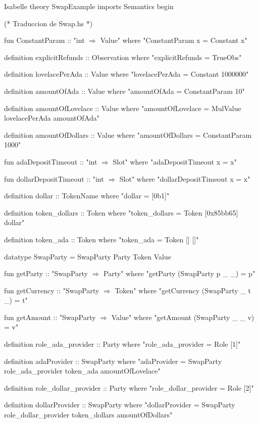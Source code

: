 \documentclass[12pt]{book}
\begin{document}
\begin{code}[title=Definición del contrato \textit{Swap}]{Isabelle}
theory SwapExample
  imports Semantics
begin

(* Traduccion de Swap.hs *)

fun ConstantParam :: "int $\Rightarrow$ Value" where
"ConstantParam x = Constant x"

definition explicitRefunds :: Observation where
"explicitRefunds = TrueObs"

definition lovelacePerAda :: Value where
"lovelacePerAda = Constant 1000000"

definition amountOfAda :: Value where 
"amountOfAda = ConstantParam 10" 

definition amountOfLovelace :: Value where
"amountOfLovelace = MulValue lovelacePerAda amountOfAda"

definition amountOfDollars :: Value where
"amountOfDollars = ConstantParam 1000"

fun adaDepositTimeout :: "int $\Rightarrow$ Slot" where
"adaDepositTimeout x = x"

fun dollarDepositTimeout :: "int $\Rightarrow$ Slot" where
"dollarDepositTimeout x = x"

definition dollar :: TokenName where
"dollar = [0b1]" 

definition token_dollars :: Token where
"token_dollars = Token [0x85bb65] dollar"

definition token_ada :: Token where
"token_ada = Token [] []"

datatype SwapParty = SwapParty Party Token Value

fun getParty :: "SwapParty $\Rightarrow$ Party" where
"getParty (SwapParty p _ _) = p"

fun getCurrency :: "SwapParty $\Rightarrow$ Token" where
"getCurrency (SwapParty _ t _) = t"

fun getAmount :: "SwapParty $\Rightarrow$ Value" where
"getAmount (SwapParty _ _ v) = v"

definition role_ada_provider :: Party where
"role_ada_provider = Role [1]"

definition adaProvider :: SwapParty where
"adaProvider = SwapParty role_ada_provider token_ada amountOfLovelace"

definition role_dollar_provider :: Party where
"role_dollar_provider = Role [2]"

definition dollarProvider :: SwapParty where
"dollarProvider = SwapParty role_dollar_provider
                            token_dollars 
                            amountOfDollars"


\end{code}
\end{document}
